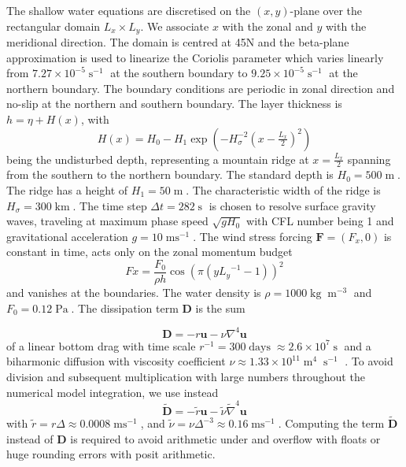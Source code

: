 \documentclass[draft]{agujournal2019}
\newcommand{\op}{\operatorname}
\begin{document}
The shallow water equations are discretised on the $(x,y)$-plane over the rectangular domain $L_x \times L_y$. We associate $x$ with the zonal and $y$ with the meridional direction. The domain is centred at 45N and the beta-plane approximation \cite{Vallis2006} is used to linearize the Coriolis parameter which varies linearly from $7.27 \times 10^{-5}\op{s}^{-1}$ at the southern boundary to $9.25 \times 10^{-5}\op{s}^{-1}$ at the northern boundary. The boundary conditions are periodic in zonal direction and no-slip at the northern and southern boundary. The layer thickness is $h = \eta + H(x)$, with
\begin{equation}
H(x) = H_0 - H_1\exp\left(-H_\sigma^{-2}(x-\tfrac{L_x}{2})^2\right)
\end{equation}
being the undisturbed depth, representing a mountain ridge at $x=\tfrac{L_x}{2}$ spanning from the southern to the northern boundary. The standard depth is $H_0 = 500\op{m}$. The ridge has a height of $H_1 = 50\op{m}$. The characteristic width of the ridge is $H_\sigma = 300\op{km}$. The time step $\Delta t = 282\op{s}$ is chosen to resolve surface gravity waves, traveling at maximum phase speed $\sqrt{gH_0}$ with CFL number being 1 and gravitational acceleration $g=10\op{ms}^{-1}$. The wind stress forcing $\mathbf{F} = (F_x,0)$ is constant in time, acts only on the zonal momentum budget
\begin{equation}
Fx = \frac{F_0}{\rho h} \cos\left(\pi\left(y{L_y}^{-1} - 1\right)\right)^2
\end{equation}
and vanishes at the boundaries. The water density is $\rho = 1000\op{kg}\op{m}^{-3}$ and $F_0 = 0.12\op{Pa}$. The dissipation term $\mathbf{D}$ is the sum

\begin{equation}
\mathbf{D} = -r\mathbf{u} - \nu \nabla^4 \mathbf{u}
\end{equation}
of a linear bottom drag with time scale $r^{-1} = 300 \op{days} \approx 2.6 \times 10^7 \op{s}$ \cite{Arbic2008} and a biharmonic diffusion with viscosity coefficient $\nu \approx 1.33\times10^{11} \op{m}^4\op{s}^{-1}$ \cite{Griffies2000}. To avoid division and subsequent multiplication with large numbers throughout the numerical model integration, we use instead
\begin{equation}
\tilde{\mathbf{D}} = -\tilde{r}\mathbf{u} - \tilde{\nu}\tilde{\nabla}^4\mathbf{u}
\end{equation}
with $\tilde{r} = r\Delta \approx 0.0008\op{ms}^{-1}$,  and $\tilde{\nu} = \nu\Delta^{-3} \approx 0.16\op{ms}^{-1}$. Computing the term $\tilde{\mathbf{D}}$ instead of $\mathbf{D}$ is required to avoid arithmetic under and overflow with floats or huge rounding errors with posit arithmetic. 
\end{document}
